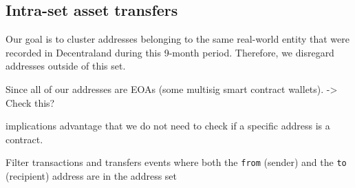 \documentclass[12pt,a4paper,titlepage,oneside,english]{article}
\begin{document}
\iffalse
Transactions: hash, from, to, timestamp, nonce, value, gasprice, gasUsed, input, functionName, chainName
Transfers: hash, from (sender), to (recipient), contractAddress (tokenContract address), value (amount, only for ERC20, ERC1155), nonce, tokenName, gas price, gas used, chainName, tokenType (token standard), token ID (only for ERC721/ERC1155), ((isSet, userAddress))

Transfer Events: 30,689,978
Transfer Events Ethereum: 7,832,778
Transfer Events Polygon: 22,857,200
Transactions = 16,092,531
Transactions Ethereum = 8,448,584
Transactions Polygon = 7,643,947

Most of the activity revolves around NFTs, especially on Polygon.
Figure X visualizes the number of daily transactions and token transfers for each chain.
\begin{figure}[h!]
	\centering
	\texttt{[image: ../figures/transfers\_tx\_by\_chain.png]}
	\caption{Monthly Transactions and Token Transfers by chain}
	\label{fig:Data}
\end{figure} 
Transfer Events, adding Information (isInSet) \\
Transactions \\
Filtering, Intra-set transfers\\
Data Structure, Fields \\
We reduced this set to addresses that were active/recorded on either Ethereum or Polygon using Blockscan\footnote{\url{https://blockscan.com/}}. This reduced the address set from to X.
Using Blockscan\footnote{\url{https://blockscan.com/}}, we were able to reduce the address set to addresses that were recorded on either Ethereum or Polygon.
\fi


\subsection{Intra-set asset transfers}
Our goal is to cluster addresses belonging to the same real-world entity that were recorded in Decentraland during this 9-month period. Therefore, we disregard addresses outside of this set. 

Since all of our addresses are EOAs (some multisig smart contract wallets). -> Check this?

implications
advantage that we do not need to check if a specific address is a contract.

Filter transactions and transfers events where both the \texttt{from} (sender) and the \texttt{to} (recipient) address are in the address set
\end{document}
